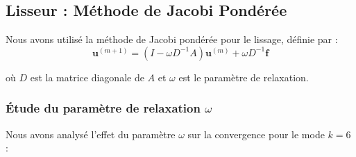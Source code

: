 \documentclass[12pt,a4paper]{article}
\begin{document}
\subsection{Lisseur : Méthode de Jacobi Pondérée}

Nous avons utilisé la méthode de Jacobi pondérée pour le lissage, définie par :
\begin{equation}
    \mathbf{u}^{(m+1)} = (I - \omega D^{-1}A)\mathbf{u}^{(m)} + \omega D^{-1}\mathbf{f}
\end{equation}

où $D$ est la matrice diagonale de $A$ et $\omega$ est le paramètre de relaxation.

\subsubsection{Étude du paramètre de relaxation \texorpdfstring{$\omega$}{omega}}

Nous avons analysé l'effet du paramètre $\omega$ sur la convergence pour le mode $k=6$ :
\end{document}
